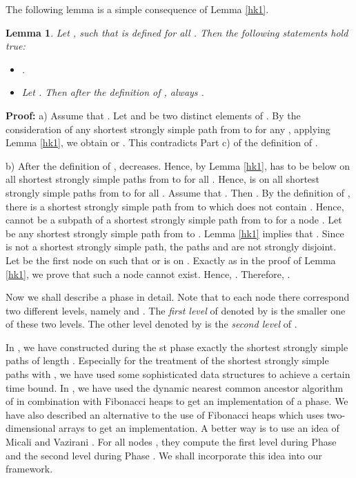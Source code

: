 \documentclass[12pt,twoside,a4paper]{article}
\def\QED{\hbox{\hskip 1pt \vrule width4pt height 6pt depth 1.5pt \hskip 1pt}}
\newtheorem{lemma}{Lemma}
\begin{document}
\medskip
The following lemma is a simple consequence of Lemma \ref{hk1}.
\begin{lemma} \label{hk1a}
Let ,  such that  is defined for all 
. Then the following statements hold true:
\begin{itemize}
\item[a)] 
.
\item[b)]
Let . Then after the definition of , always
.
\end{itemize}
\end{lemma}
{\bf Proof:} a) Assume that . Let  and  be two
distinct elements of . By the consideration of any shortest strongly 
simple path from  to  for any , applying Lemma \ref{hk1}, we obtain 
 or . This
contradicts Part c) of the definition of .

\medskip
\noindent
b)
After the definition of ,  decreases. Hence,
by Lemma \ref{hk1}, 
 has to be below  on all shortest strongly simple paths from
 to  for all . Hence,  is on all shortest strongly 
simple paths from  to  for all . Assume that 
. Then . 
By the definition of , there is a shortest strongly simple path  
from  to  
which does not contain . Hence,  cannot be a subpath of a shortest 
strongly simple path from  to  for a node . Let  
be any shortest strongly simple path from  
to . Lemma \ref{hk1} implies that . Since 
 is not a shortest strongly simple path, the paths  and  are 
not strongly disjoint. Let  be the first node on  such that  or  
is on . Exactly as in the proof of Lemma \ref{hk1}, we prove that such a node cannot 
exist. Hence, . Therefore, .
\QED

\medskip
Now we shall describe a phase in detail. Note that to each node  there correspond 
two different levels, namely  and . The {\em first level} of  
denoted by  is the smaller one of these two levels. The other level denoted by 
 is the {\em second level} of .

In \cite{Bl1,Bl4}, we have constructed during the
st phase exactly the shortest strongly simple paths of length . Especially for
the treatment of the shortest strongly simple paths 
with , we have used some sophisticated data structures to achieve a 
certain time bound. In \cite{Bl4}, we have used the dynamic nearest common ancestor algorithm 
of \cite{Ga2} in combination with Fibonacci heaps \cite{FrTa} to get an
 implementation of a phase. We have also described an alternative to the
use of Fibonacci heaps which uses two-dimensional arrays to get an 
implementation. A better way is to use an idea of Micali and Vazirani \cite{MV,Va1}. 
For all nodes , they compute the first level during Phase  and the second level 
during Phase . We shall incorporate this idea into 
our framework.
\end{document}
